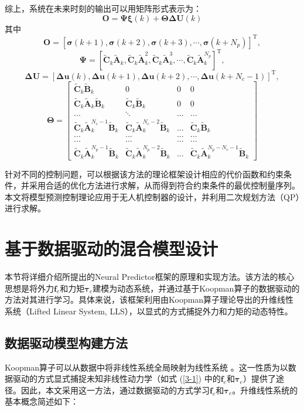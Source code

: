 \documentclass[lang=chs, degree=master, blindreview=false, winfonts=true]{yanputhesis}
\begin{document}
综上，系统在未来时刻的输出可以用矩阵形式表示为：
\begin{equation}
    \bm O = \bm \Psi \bm \xi(k) + \bm \Theta \bm \Delta \bm U(k)
\end{equation}
其中$$
\boldsymbol{O} = 
\left[
	\boldsymbol{\sigma}(k+1) , \boldsymbol{\sigma}(k+2) , \boldsymbol{\sigma}(k+3) , \cdots , \boldsymbol{\sigma}(k+N_p)
\right]^\mathrm{T},$$
$$\boldsymbol{\Psi} = 
\left[
	\boldsymbol{\tilde{C}}_k\boldsymbol{\tilde{A}}_k , \boldsymbol{\tilde{C}}_k\boldsymbol{\tilde{A}}_k^2 , \boldsymbol{\tilde{C}}_k\boldsymbol{\tilde{A}}_k^3 , \cdots , \boldsymbol{\tilde{C}}_k\boldsymbol{\tilde{A}}_k^{N_p}
\right]^\mathrm{T},$$
$$\boldsymbol{\Delta U} = 
\left[
	\bm \Delta \bm u(k) , \bm \Delta \bm u(k+1) , \bm \Delta \bm u(k+2) , \cdots , \bm \Delta \bm u(k+N_c-1)
\right]^\mathrm{T},$$
$$\bm \Theta=\begin{bmatrix}\tilde{\bm C}_k\tilde{\bm B}_k&0&0&0\\\tilde{\bm C}_k\tilde{\bm A}_k\tilde{\bm B}_k&\tilde{\bm C}_k\tilde{\bm B}_k&0&0\\...&\ddots&...&...\\\tilde{\bm C}_k\tilde{\bm A}_k^{N_c-1}\tilde{\bm B}_k&\tilde{\bm C}_k\tilde{\bm A}_k^{N_c-2}\tilde{\bm B}_k&...&\tilde{\bm C}_k\tilde{\bm B}_k\\...&...&...&...\\...&...&...&...\\\tilde{\bm C}_k\tilde{\bm A}_k^{N_p-1}\tilde{\bm B}_k&\tilde{\bm C}_k\tilde{\bm A}_k^{N_p-2}\tilde{\bm B}_k&...&\tilde{\bm C}_k\tilde{\bm A}_k^{N_p-N_c-1}\tilde{\bm B}_k\end{bmatrix}$$

针对不同的控制问题，可以根据该方法的理论框架设计相应的代价函数和约束条件，并采用合适的优化方法进行求解，从而得到符合约束条件的最优控制量序列。本文将模型预测控制理论应用于无人机控制器的设计，并利用二次规划方法（QP）进行求解。

\section{基于数据驱动的混合模型设计}
本节将详细介绍所提出的Neural Predictor框架的原理和实现方法。该方法的核心思想是将外力$\bm{f}_e$和力矩$\bm{\tau}_e$建模为动态系统，并通过基于Koopman算子的数据驱动的方法对其进行学习。具体来说，该框架利用由Koopman算子理论导出的升维线性系统（Lifted Linear System, LLS），以显式的方式捕捉外力和力矩的动态特性。
\subsection{数据驱动模型构建方法}
Koopman算子可以从数据中将非线性系统全局映射为线性系统 \cite{Mamakoukas2023}。这一性质为以数据驱动的方式显式捕捉未知非线性动力学（如式 (\ref{3-1}) 中的$\bm f_e$和$\bm \tau_e$）提供了途径。因此，本文采用这一方法，通过数据驱动的方式学习$\bm{f}_e$和$\bm{\tau}_e$。升维线性系统的基本概念简述如下：
\end{document}
